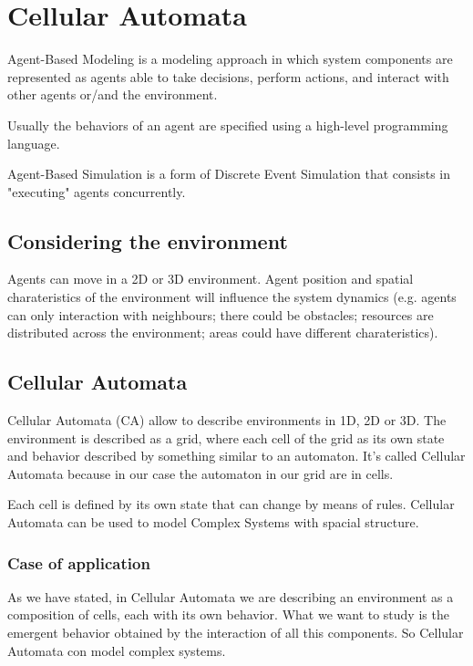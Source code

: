 \chapter{Cellular Automata}
Agent-Based Modeling is a modeling approach in which system components are represented as agents able to take decisions, perform actions, and interact with other agents or/and the environment.\par
Usually the behaviors of an agent are specified using a high-level programming language.\par
Agent-Based Simulation is a form of Discrete Event Simulation that consists in "executing" agents concurrently.

\section{Considering the environment}
Agents can move in a 2D or 3D environment. Agent position and spatial charateristics of the environment will influence the system dynamics (e.g. agents can only interaction with neighbours; there could be obstacles; resources are distributed across the environment; areas could have different charateristics).

\section{Cellular Automata}
Cellular Automata (CA) allow to describe environments in 1D, 2D or 3D. The environment is described as a grid, where each cell of the grid as its own state and behavior described by something similar to an automaton. It's called Cellular Automata because in our case the automaton in our grid are in cells.\par
Each cell is defined by its own state that can change by means of rules. Cellular Automata can be used to model Complex Systems with spacial structure.

\subsection{Case of application}
As we have stated, in Cellular Automata we are describing an environment as a composition of cells, each with its own behavior. What we want to study is the emergent behavior obtained by the interaction of all this components. So Cellular Automata con model complex systems.

